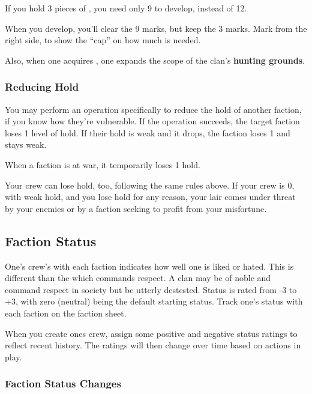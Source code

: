 \begin{qb}
If you hold 3 pieces of , you need only 9  to develop, instead of 12. 

When you develop, you’ll clear the 9  marks, but keep the 3  marks. Mark  from the right side, to show the ``cap'' on how much  is needed.
\end{qb}

Also, when one acquires , one expands the scope of the clan's \textbf{hunting grounds}.

\subsubsection{Reducing Hold}

You may perform an operation specifically to reduce the hold of another faction, if you know how they’re vulnerable. If the operation succeeds, the target faction loses 1 level of hold. If their hold is weak and it drops, the faction loses 1  and stays weak.

When a faction is at war, it temporarily loses 1 hold.

Your crew can lose hold, too, following the same rules above. If your crew is  0, with weak hold, and you lose hold for any reason, your lair comes under threat by your enemies or by a faction seeking to profit from your misfortune.

\subsection{Faction Status}

One's crew’s  with each faction indicates how well one is liked or hated. This is different than the  which commands respect. A clan may be of noble  and command respect in society but be utterly destested. Status is rated from -3 to +3, with zero (neutral) being the default starting status. Track one's status with each faction on the faction sheet.

When you create ones crew, assign some positive and negative status ratings to reflect recent history. The ratings will then change over time based on actions in play.

\subsubsection{Faction Status Changes}

